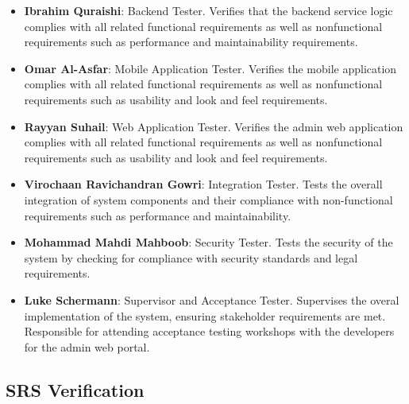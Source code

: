 \documentclass[12pt, titlepage]{article}
\begin{document}
\begin{itemize}
  \item \textbf{Ibrahim Quraishi}: Backend Tester. Verifies that the backend service logic complies with all related functional requirements as well as nonfunctional requirements such as performance and maintainability requirements.
  \item \textbf{Omar Al-Asfar}: Mobile Application Tester. Verifies the mobile application complies with all related functional requirements as well as nonfunctional requirements such as usability and look and feel requirements.
  \item \textbf{Rayyan Suhail}: Web Application Tester. Verifies the admin web application complies with all related functional requirements as well as nonfunctional requirements such as usability and look and feel requirements. 
  \item \textbf{Virochaan Ravichandran Gowri}: Integration Tester. Tests the overall integration of system components and their compliance with non-functional requirements such as performance and maintainability.
  \item \textbf{Mohammad Mahdi Mahboob}: Security Tester. Tests the security of the system by checking for compliance with security standards and legal requirements.
  \item \textbf{Luke Schermann}: Supervisor and Acceptance Tester. Supervises the overal implementation of the system, ensuring stakeholder requirements are met. Responsible for attending acceptance testing workshops with the developers for the admin web portal.
\end{itemize}

\subsection{SRS Verification}


\end{document}
